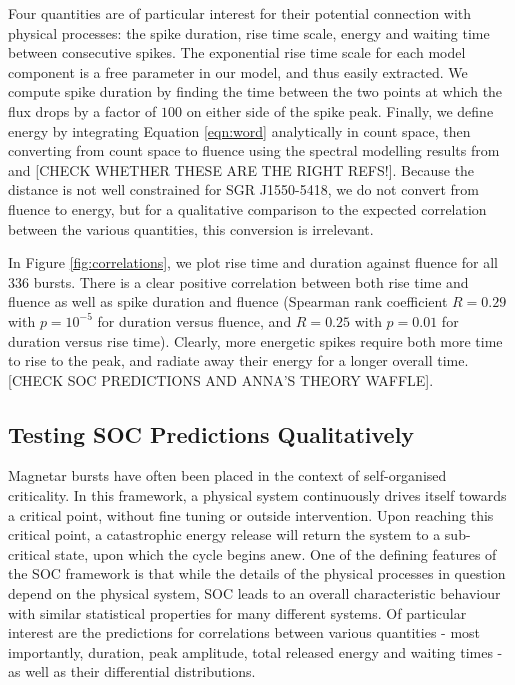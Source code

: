 \documentclass[12pt]{emulateapj}
\begin{document}
Four quantities are of particular interest for their potential connection with physical processes: the spike duration, rise time scale,
energy and waiting time between consecutive spikes. The exponential rise time scale for each model component is a free parameter
in our model, and thus easily extracted. We compute spike duration by finding the time between the two points at which the flux drops by a
 factor of $100$ on either side of the spike peak. Finally, we define energy by integrating Equation \ref{eqn:word} analytically in count space,
 then converting from count space to fluence using the spectral modelling results from \citet{vanderhorst2012} and \citet{vonkienlin2012} [CHECK WHETHER
 THESE ARE THE RIGHT REFS!]. Because the distance is not well constrained for SGR J1550-5418, we do not convert from
 fluence to energy, but for a qualitative comparison to the expected correlation between the various quantities, this conversion is irrelevant.
 
 In Figure \ref{fig:correlations}, we plot rise time and duration against fluence for all $336$ bursts. There is a clear positive
 correlation between both rise time and fluence as well as spike duration and fluence (Spearman rank coefficient $R = 0.29$ with $p=10^{-5}$ for duration versus fluence,
 and $R = 0.25$ with $p = 0.01$ for duration versus rise time). Clearly, more energetic spikes require both more time to rise to the peak,
 and radiate away their energy for a longer overall time. [CHECK SOC PREDICTIONS AND ANNA'S THEORY WAFFLE].
 

\subsection{Testing SOC Predictions Qualitatively}

Magnetar bursts have often been placed in the context of self-organised criticality. In this framework, a physical system continuously drives
itself towards a critical point, without fine tuning or outside intervention. Upon reaching this critical point, a catastrophic energy
release will return the system to a sub-critical state, upon which the cycle begins anew. One of the defining features of the SOC
framework is that while the details of the physical processes in question depend on the physical system, SOC leads to an overall
characteristic behaviour with similar statistical properties for many different systems. Of particular interest are the predictions for 
correlations between various quantities - most importantly, duration, peak amplitude, total released energy and waiting times -  as well
as their differential distributions. 
\end{document}
